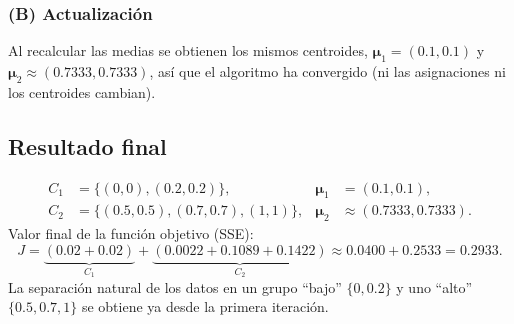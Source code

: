 \subsubsection*{(B) Actualización}
Al recalcular las medias se obtienen los mismos centroides, $\boldsymbol{\mu}_1 = (0.1, 0.1)$ y $\boldsymbol{\mu}_2 \approx (0.7333, 0.7333)$, así que el algoritmo ha convergido (ni las asignaciones ni los centroides cambian).

\subsection*{Resultado final}
\begin{align*}
    C_1 &= \{(0, 0), (0.2, 0.2)\}, & \boldsymbol{\mu}_1 &= (0.1, 0.1), \\
    C_2 &= \{(0.5, 0.5), (0.7, 0.7), (1, 1)\}, & \boldsymbol{\mu}_2 &\approx (0.7333, 0.7333).
\end{align*}
Valor final de la función objetivo (SSE):
\[
    J = \underbrace{(0.02 + 0.02)}_{C_1} + \underbrace{(0.0022 + 0.1089 + 0.1422)}_{C_2} \approx 0.0400 + 0.2533 = 0.2933.
\]
La separación natural de los datos en un grupo ``bajo'' $\{0, 0.2\}$ y uno ``alto'' $\{0.5, 0.7, 1\}$ se obtiene ya desde la primera iteración.
